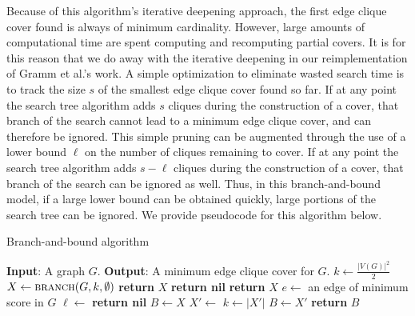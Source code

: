 \documentclass[12pt]{article}
\begin{document}
    Because of this algorithm's iterative deepening approach, the first edge clique cover found is always of minimum cardinality.
    However, large amounts of computational time are spent computing and recomputing partial covers.
    It is for this reason that we do away with the iterative deepening in our reimplementation of Gramm et al.'s work.
    A simple optimization to eliminate wasted search time is to track the size $s$ of the smallest edge clique cover found so far.
    If at any point the search tree algorithm adds $s$ cliques during the construction of a cover, that branch of the search cannot lead to a minimum edge clique cover, and can therefore be ignored.
    This simple pruning can be augmented through the use of a lower bound $\ell$ on the number of cliques remaining to cover.
    If at any point the search tree algorithm adds $s  - \ell$ cliques during the construction of a cover, that branch of the search can be ignored as well.
    Thus, in this branch-and-bound model, if a large lower bound can be obtained quickly, large portions of the search tree can be ignored.
    We provide pseudocode for this algorithm below.
    \begin{algorithm}
    \caption{Branch-and-bound algorithm}    
    \begin{algorithmic}
        \State \textbf{Input}: A graph $G$.
        \State \textbf{Output}: A minimum edge clique cover for $G$.
        \State $k \gets \frac{|V(G)|^2}{2}$ 
        \State $X \gets \Call{branch}{G, k, \emptyset}$
        \State \textbf{return} $X$
            \State {}
                \State \textbf{return nil}
            \Else{}
                \State \textbf{return} $X$
            \EndIf
            \EndIf
            \State $e \gets$ an edge of minimum score in $G$
            \State $\ell \gets$ 
                \State \textbf{return nil}
            \EndIf
            \State $B \gets X$
                \State $X' \gets$ 
                    \State $k \gets |X'|$
                    \State $B \gets X'$
                \EndIf
            \EndFor
            \State \textbf{return} $B$
        \EndFunction
    \end{algorithmic}
    \end{algorithm}
\end{document}
